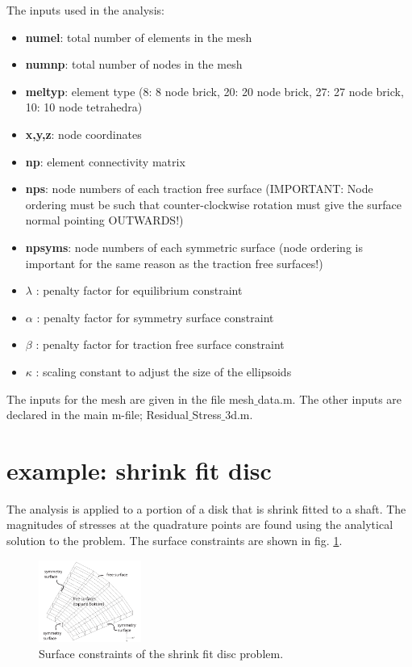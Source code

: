 \documentclass{article}
\begin{document}
The inputs used in the analysis:
\begin{itemize}
\item \textbf{numel}: total number of elements in the mesh
\item \textbf{numnp}: total number of nodes in the mesh
\item \textbf{meltyp}: element type (8: 8 node brick, 20: 20 node brick, 27: 27 node brick, 10: 10 node tetrahedra)
\item \textbf{x,y,z}: node coordinates
\item \textbf{np}: element connectivity matrix
\item \textbf{nps}: node numbers of each traction free surface (IMPORTANT: Node ordering must be such that counter-clockwise rotation must give the surface normal pointing OUTWARDS!)
\item \textbf{npsyms}: node numbers of each symmetric surface (node ordering is important for the same reason as the traction free surfaces!)
\item $\lambda$ : penalty factor for equilibrium constraint
\item $\alpha$ : penalty factor for symmetry surface constraint
\item $\beta$ : penalty factor for traction free surface constraint
\item $\kappa$ : scaling constant to adjust the size of the ellipsoids
\end{itemize}

The inputs for the mesh are given in the file mesh$\_$data.m. The other inputs are declared in the main m-file; Residual$\_$Stress$\_$3d.m.

\section{example: shrink fit disc}

The analysis is applied to a portion of a disk that is shrink fitted to a shaft. The magnitudes of stresses at the quadrature points are found using the analytical solution to the problem. The surface constraints are shown in fig. \ref{fig5}.


\begin{figure}[ht!]
    \centering
            \includegraphics[width=0.3\textwidth]{discbcs.pdf}
    \caption{Surface constraints of the shrink fit disc problem.}
    \label{fig5}
\end{figure}
\end{document}
